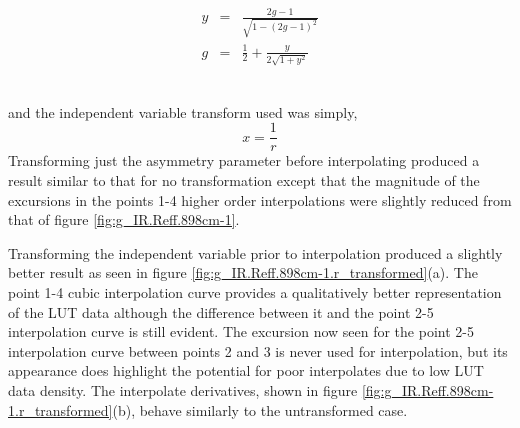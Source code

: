 \parbox{10cm}{\begin{eqnarray*}
                y & = & \frac{2g-1}{\sqrt{1-(2g-1)^{2}}}\\
                g & = & \frac{1}{2}+\frac{y}{2\sqrt{1+y^{2}}}
              \end{eqnarray*}}\hfill
\parbox{1cm}{\begin{eqnarray}\end{eqnarray}}

and the independent variable transform\cite{ref:variable_transform} used was simply,
\begin{equation}
  x = \frac{1}{r}
  \label{eqn:r_transform}
\end{equation}
Transforming just the asymmetry parameter before interpolating produced a result similar to that for no transformation except that the magnitude of the excursions in the points 1-4 higher order interpolations were slightly reduced from that of figure \ref{fig:g_IR.Reff.898cm-1}.

Transforming the independent variable prior to interpolation produced a slightly better result as seen in figure \ref{fig:g_IR.Reff.898cm-1.r_transformed}(a). The point 1-4 cubic interpolation curve provides a qualitatively better representation of the LUT data although the difference between it and the point 2-5 interpolation curve is still evident. The excursion now seen for the point 2-5 interpolation curve between points 2 and 3 is never used for interpolation, but its appearance does highlight the potential for poor interpolates due to low LUT data density. The interpolate derivatives, shown in figure \ref{fig:g_IR.Reff.898cm-1.r_transformed}(b), behave similarly to the untransformed case.

